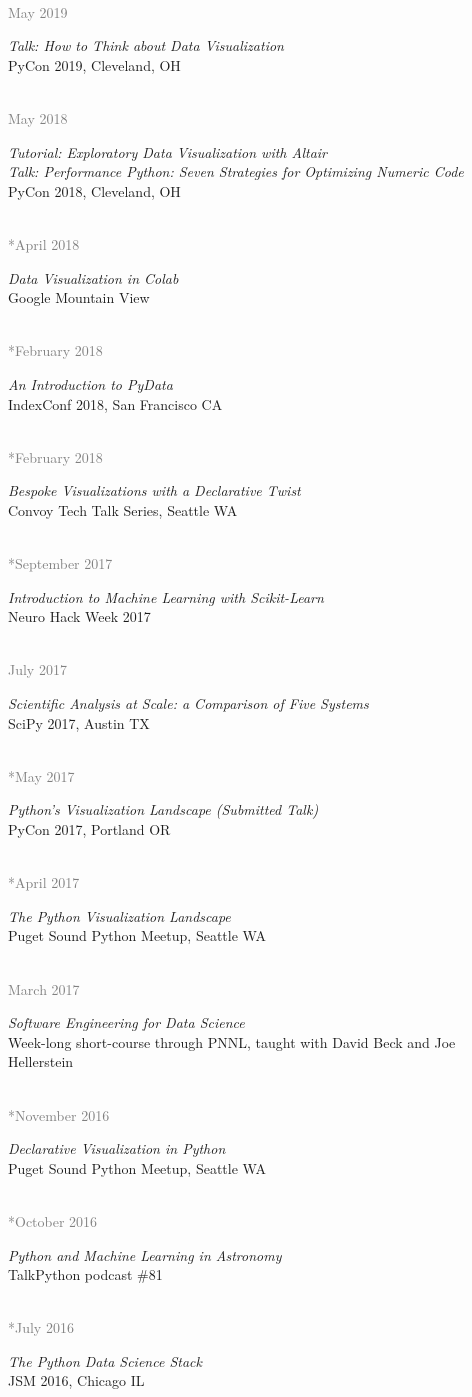 \documentclass{article} %
\newlength\sidebarwidth
\newcommand{\dateonly}[2][]
	 {\begin{minipage}{\textwidth}
	 \vspace*{.4\baselineskip}
         \nopagebreak\hspace{0in}%
         \nopagebreak\begin{minipage}[t]{\sidebarwidth - .2cm}
         \raggedleft {~}
         {\\[-\baselineskip] \textcolor{gray}{\footnotesize #1}}
	 \end{minipage}%
	 \hfill
	 \begin{minipage}[t]{\linewidth - \sidebarwidth}
	 #2%
	 \end{minipage}%
	 \vspace*{.2\baselineskip plus 1\baselineskip minus
	 .2\baselineskip}%
	 \end{minipage}}
\begin{document}
  \dateonly[May 2019]{
    {\it Talk: How to Think about Data Visualization}\\
    PyCon 2019, Cleveland, OH
  }

  \dateonly[May 2018]{
    {\it Tutorial: Exploratory Data Visualization with Altair}\\
    {\it Talk: Performance Python: Seven Strategies for Optimizing Numeric Code}\\
    PyCon 2018, Cleveland, OH
  }

  \dateonly[**April 2018]{
    {\it Data Visualization in Colab}\\
    Google Mountain View
  }

  \dateonly[**February 2018]{
    {\it An Introduction to PyData}\\
    IndexConf 2018, San Francisco CA
  }

  \dateonly[**February 2018]{
    {\it Bespoke Visualizations with a Declarative Twist}\\
    Convoy Tech Talk Series, Seattle WA
  }

  \dateonly[**September 2017]{
    {\it Introduction to Machine Learning with Scikit-Learn}\\
    Neuro Hack Week 2017
  }

  \dateonly[July 2017]{
     {\it Scientific Analysis at Scale: a Comparison of Five Systems}\\
     SciPy 2017, Austin TX
  }

  \dateonly[**May 2017]{
     {\it Python's Visualization Landscape (Submitted Talk)}\\
     PyCon 2017, Portland OR
  }

  \dateonly[**April 2017]{
     {\it The Python Visualization Landscape}\\
     Puget Sound Python Meetup, Seattle WA
  }

  \dateonly[March 2017]{
    {\it Software Engineering for Data Science}\\
    Week-long short-course through PNNL, taught with David Beck and Joe Hellerstein
  }

  \dateonly[**November 2016]{
     {\it Declarative Visualization in Python}\\
     Puget Sound Python Meetup, Seattle WA
  }

  \dateonly[**October 2016]{
     {\it Python and Machine Learning in Astronomy}\\
     TalkPython podcast \#81
  }

  \dateonly[**July 2016]{
      {\it The Python Data Science Stack}\\
      JSM 2016, Chicago IL
  }
\end{document}
